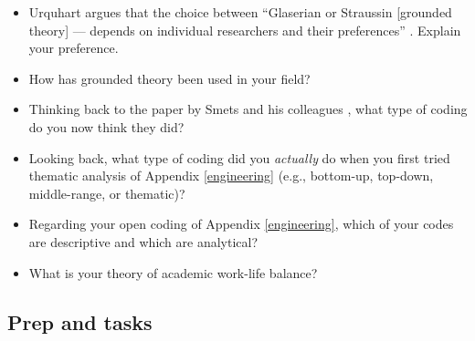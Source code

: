 \documentclass[]{book}
\theoremstyle{definition}
\theoremstyle{definition}
\theoremstyle{definition}
\theoremstyle{remark}
\begin{document}
\begin{itemize}
\item
  Urquhart argues that the choice between ``Glaserian or Straussin
  {[}grounded theory{]} --- depends on individual researchers and their
  preferences'' \autocite{urquhart_2017_groundedtheoryqualitative}.
  Explain your preference.
\item
  How has grounded theory been used in your field?
\item
  Thinking back to the paper by Smets and his colleagues
  \autocite{smets_2015_reinsurancetradinglloyd}, what type of coding do
  you now think they did?
\item
  Looking back, what type of coding did you \emph{actually} do when you
  first tried thematic analysis of Appendix \ref{engineering} (e.g.,
  bottom-up, top-down, middle-range, or thematic)?
\item
  Regarding your open coding of Appendix \ref{engineering}, which of
  your codes are descriptive and which are analytical?
\item
  What is your theory of academic work-life balance?
\end{itemize}

\hypertarget{prep-and-tasks-8}{%
\subsection*{Prep and tasks}\label{prep-and-tasks-8}}
\end{document}
